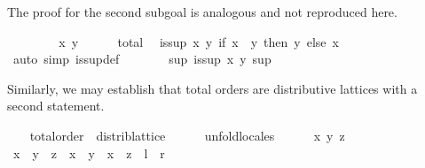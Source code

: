 \begin{isabellebody}
%
\begin{isamarkuptxt}%
\normalsize
   The proof for the second subgoal is analogous and not
  reproduced here.%
\end{isamarkuptxt}%
\isamarkuptrue%
%
\endisatagvisible
{\isafoldvisible}%
%
\isadelimvisible
%
\endisadelimvisible
%
\isadeliminvisible
\ \ %
\endisadeliminvisible
%
\isataginvisible
{}\isamarkupfalse%
\isanewline
\ \ \ \ \isamarkupfalse%
\ x\ y\isanewline
\ \ \ \ \isamarkupfalse%
\ total\ \isamarkupfalse%
\ {}is{}sup\ x\ y\ {}if\ x\ {}\ y\ then\ y\ else\ x{}{}\isanewline
\ \ \ \ \ \ \isamarkupfalse%
\ {}auto\ simp{}\ is{}sup{}def{}\isanewline
\ \ \ \ \isamarkupfalse%
\ \isamarkupfalse%
\ {}{}sup{}\ is{}sup\ x\ y\ sup{}\ \isamarkupfalse%
%
\endisataginvisible
{\isafoldinvisible}%
%
\isadeliminvisible
%
\endisadeliminvisible
%
\isadelimvisible
\ %
\endisadelimvisible
%
\isatagvisible
{}\isamarkupfalse%
%
\endisatagvisible
{\isafoldvisible}%
%
\isadelimvisible
%
\endisadelimvisible
%
\begin{isamarkuptext}%
Similarly, we may establish that total orders are distributive
  lattices with a second  statement.%
\end{isamarkuptext}%
\isamarkuptrue%
\ \ \isamarkupfalse%
\ total{}order\ {}\ distrib{}lattice\isanewline
%
\isadelimproof
\ \ \ \ %
\endisadelimproof
%
\isatagproof
{}\isamarkupfalse%
\ unfold{}locales\isanewline
\ \ \ \ \isamarkupfalse%
\ x\ y\ z\isanewline
\ \ \ \ \isamarkupfalse%
\ {}x\ {}\ {}y\ {}\ z{}\ {}\ x\ {}\ y\ {}\ x\ {}\ z{}\ {}\ {}{}l\ {}\ {}r{}{}%

\end{isabellebody}
